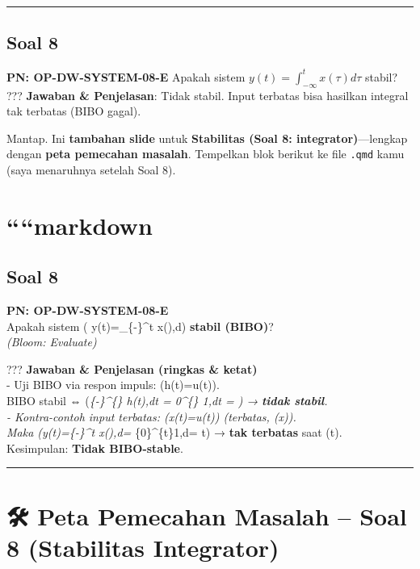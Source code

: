 \documentclass[
  letterpaper,
  DIV=11,
  numbers=noendperiod]{scrreprt}
\begin{document}
\begin{center}\rule{0.5\linewidth}{0.5pt}\end{center}

\subsection{Soal 8}\label{soal-8}

\textbf{PN: OP-DW-SYSTEM-08-E} Apakah sistem
\(y(t)=\int_{-\infty}^t x(\tau)d\tau\) stabil? ??? \textbf{Jawaban \&
Penjelasan}: Tidak stabil. Input terbatas bisa hasilkan integral tak
terbatas (BIBO gagal).

Mantap. Ini \textbf{tambahan slide} untuk \textbf{Stabilitas (Soal 8:
integrator)}---lengkap dengan \textbf{peta pemecahan masalah}. Tempelkan
blok berikut ke file \texttt{.qmd} kamu (saya menaruhnya setelah Soal
8).

\section{````markdown}\label{markdown}

\subsection{Soal 8}\label{soal-8-1}

\textbf{PN: OP-DW-SYSTEM-08-E}\\
Apakah sistem ( y(t)=\displaystyle\int\_\{-\infty\}\^{}t x(\tau),d\tau )
\textbf{stabil (BIBO)}?\\
\emph{(Bloom: Evaluate)}

??? \textbf{Jawaban \& Penjelasan (ringkas \& ketat)}\\
- Uji BIBO via respon impuls: (h(t)=u(t)).\\
BIBO stabil ⇔ (\int\emph{\{-\infty\}\^{}\{\infty\}
\textbar h(t)\textbar,dt = \int\emph{0\^{}\{\infty\} 1,dt = \infty) →
\textbf{tidak stabil}.\\
- Kontra-contoh input terbatas: (x(t)=u(t)) (terbatas,
(\textbar x\textbar{})).\\
Maka (y(t)=\int}\{-\infty\}\^{}t x(\tau),d\tau =
\int}\{0\}\^{}\{t\}1,d\tau = t) → \textbf{tak terbatas} saat
(t\to\infty).\\
Kesimpulan: \textbf{Tidak BIBO-stable}.

\begin{center}\rule{0.5\linewidth}{0.5pt}\end{center}

\section{🛠️ Peta Pemecahan Masalah -- Soal 8 (Stabilitas
Integrator)}\label{peta-pemecahan-masalah-soal-8-stabilitas-integrator}
\end{document}

